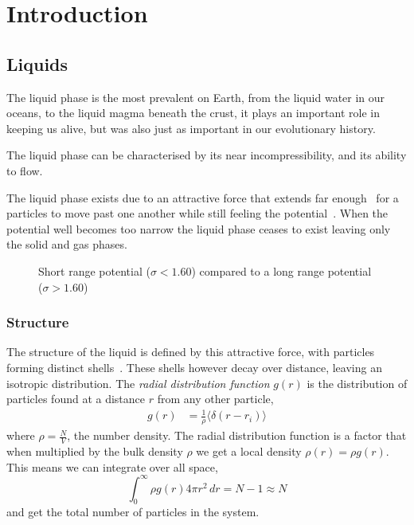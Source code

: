 
\chapter{Introduction}

\section{Liquids}
The liquid phase is the most prevalent on Earth, from the liquid water in our oceans, to the liquid magma beneath the crust, it plays an important role in keeping us alive, but was also just as important in our evolutionary history.

The liquid phase can be characterised by its near incompressibility, and its ability to flow. 

The liquid phase exists due to an attractive force that extends far enough~ for a particles to move past one another while still feeling the potential~\cite{tejero:94}. When the potential well becomes too narrow the liquid phase ceases to exist leaving only the solid and gas phases.

\begin{figure}
    \label{fig:potentials}
    \caption{Short range potential ($\sigma < 1.60$) compared to a long range potential ($\sigma > 1.60$)}
\end{figure}

\subsection{Structure}
The structure of the liquid is defined by this attractive force, with particles forming distinct shells~. These shells however decay over distance, leaving an isotropic distribution. The \emph{radial distribution function} $g(r)$ is the distribution of particles found at a distance $r$ from any other particle,
\begin{align}
    g(r) &= \frac{1}{\rho} \langle \delta(r - r_i) \rangle
\end{align}
where $\rho = \frac{N}{V}$, the number density. The radial distribution function is a factor that when multiplied by the bulk density $\rho$ we get a local density $\rho(r) = \rho g(r)$. This means we can integrate over all space,
\begin{equation}
    \int_0^\infty \rho g(r) 4 \pi r^2\,dr = N-1 \approx N
\end{equation}
and get the total number of particles in the system.

